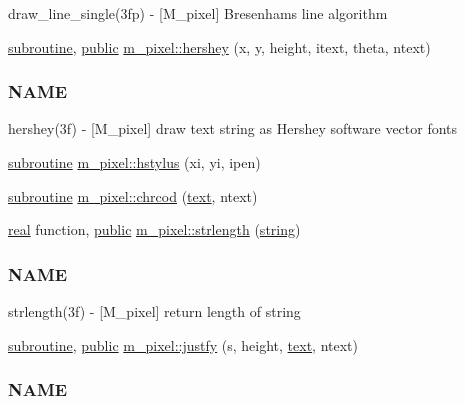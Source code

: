 \begin{DoxyCompactItemize}
\begin{DoxyCompactList}
draw\+\_\+line\+\_\+single(3fp) -\/ \mbox{[}M\+\_\+pixel\mbox{]} Bresenham\textquotesingle{}s line algorithm \end{DoxyCompactList}\item 
\hyperlink{M__stopwatch_83_8txt_acfbcff50169d691ff02d4a123ed70482}{subroutine}, \hyperlink{M__stopwatch_83_8txt_a2f74811300c361e53b430611a7d1769f}{public} \hyperlink{namespacem__pixel_a80dc3cb149287470a9837de8dd3f05bc}{m\+\_\+pixel\+::hershey} (x, y, height, itext, theta, ntext)
\begin{DoxyCompactList}\small\item\em \subsubsection*{N\+A\+ME}

hershey(3f) -\/ \mbox{[}M\+\_\+pixel\mbox{]} draw text string as Hershey software vector fonts \end{DoxyCompactList}\item 
\hyperlink{M__stopwatch_83_8txt_acfbcff50169d691ff02d4a123ed70482}{subroutine} \hyperlink{namespacem__pixel_a15c5daa9ab477991c2c6e17741cf40eb}{m\+\_\+pixel\+::hstylus} (xi, yi, ipen)
\item 
\hyperlink{M__stopwatch_83_8txt_acfbcff50169d691ff02d4a123ed70482}{subroutine} \hyperlink{namespacem__pixel_ab25c6cce708ff91a79bbabb23d591a8b}{m\+\_\+pixel\+::chrcod} (\hyperlink{README_8txt_afda9e6898bd09238e9e9be4c62ce246b}{text}, ntext)
\item 
\hyperlink{read__watch_83_8txt_abdb62bde002f38ef75f810d3a905a823}{real} function, \hyperlink{M__stopwatch_83_8txt_a2f74811300c361e53b430611a7d1769f}{public} \hyperlink{namespacem__pixel_a0468f8d9308bade7f8f2a68a133271d2}{m\+\_\+pixel\+::strlength} (\hyperlink{what__overview_81_8txt_a74cb7e955273b9f9157b4f0c18a38849}{string})
\begin{DoxyCompactList}\small\item\em \subsubsection*{N\+A\+ME}

strlength(3f) -\/ \mbox{[}M\+\_\+pixel\mbox{]} return length of string \end{DoxyCompactList}\item 
\hyperlink{M__stopwatch_83_8txt_acfbcff50169d691ff02d4a123ed70482}{subroutine}, \hyperlink{M__stopwatch_83_8txt_a2f74811300c361e53b430611a7d1769f}{public} \hyperlink{namespacem__pixel_a7b08886c913b47694edeb60fa747afc4}{m\+\_\+pixel\+::justfy} (s, height, \hyperlink{README_8txt_afda9e6898bd09238e9e9be4c62ce246b}{text}, ntext)
\begin{DoxyCompactList}\small\item\em \subsubsection*{N\+A\+ME}


\end{DoxyCompactList}
\end{DoxyCompactItemize}
